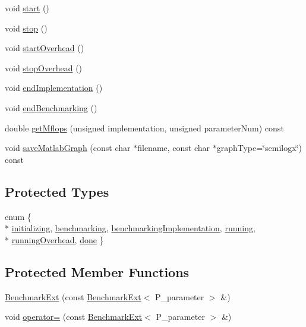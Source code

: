 \begin{DoxyCompactItemize}
\item 
void \hyperlink{classBenchmarkExt_a98bbac917db2353740730ac73258bb3a}{start} ()
\item 
void \hyperlink{classBenchmarkExt_ac014ea2e61d5a02cb9c1a2004422f495}{stop} ()
\item 
void \hyperlink{classBenchmarkExt_a9f1bedb03cd8a8124c2713633183fc5c}{start\+Overhead} ()
\item 
void \hyperlink{classBenchmarkExt_a26fd92767c375e3539f08c6c542e89b6}{stop\+Overhead} ()
\item 
void \hyperlink{classBenchmarkExt_a7bfa377672de0d9d50a65db4147877c2}{end\+Implementation} ()
\item 
void \hyperlink{classBenchmarkExt_a9200b8acb26cf12fce1ad76cf68eb482}{end\+Benchmarking} ()
\item 
double \hyperlink{classBenchmarkExt_ae3132627feae9ecb764840e9efa201ae}{get\+Mflops} (unsigned implementation, unsigned parameter\+Num) const 
\item 
void \hyperlink{classBenchmarkExt_aeb9b16cfd88b642752b4bed62249b1da}{save\+Matlab\+Graph} (const char $\ast$filename, const char $\ast$graph\+Type=\char`\"{}semilogx\char`\"{}) const 
\end{DoxyCompactItemize}
\subsection*{Protected Types}
\begin{DoxyCompactItemize}
\item 
enum \{ \\*
\hyperlink{classBenchmarkExt_a55b7d793a0348db07b3f72500a1cd379ac1685f3de9451f8999ddc220c41112c3}{initializing}, 
\hyperlink{classBenchmarkExt_a55b7d793a0348db07b3f72500a1cd379a2dbdb8ed5bf69d77871198d57f61b950}{benchmarking}, 
\hyperlink{classBenchmarkExt_a55b7d793a0348db07b3f72500a1cd379a929e1c22283b0f4c9139d9a8ddd16aaa}{benchmarking\+Implementation}, 
\hyperlink{classBenchmarkExt_a55b7d793a0348db07b3f72500a1cd379a3be87a26f1f7c27f1bade230bddfa2b4}{running}, 
\\*
\hyperlink{classBenchmarkExt_a55b7d793a0348db07b3f72500a1cd379a3b9014d41ffedb8319adc77024b8dd2e}{running\+Overhead}, 
\hyperlink{classBenchmarkExt_a55b7d793a0348db07b3f72500a1cd379afa431ea190fb7c2a26b5170844379962}{done}
 \}
\end{DoxyCompactItemize}
\subsection*{Protected Member Functions}
\begin{DoxyCompactItemize}
\item 
\hyperlink{classBenchmarkExt_a8b1bee1787a76da9701f72685c5efa57}{Benchmark\+Ext} (const \hyperlink{classBenchmarkExt}{Benchmark\+Ext}$<$ P\+\_\+parameter $>$ \&)
\item 
void \hyperlink{classBenchmarkExt_a435740f4b1390802068df2768d9459bd}{operator=} (const \hyperlink{classBenchmarkExt}{Benchmark\+Ext}$<$ P\+\_\+parameter $>$ \&)
\end{DoxyCompactItemize}
